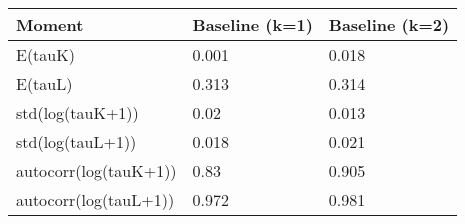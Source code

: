 \begin{tabular}{lll}
Moment & Baseline (k=1) & Baseline (k=2) \\ 
\hline 
E(tauK) & 0.001 & 0.018 \\ 
E(tauL) & 0.313 & 0.314 \\ 
std(log(tauK+1)) & 0.02 & 0.013 \\ 
std(log(tauL+1)) & 0.018 & 0.021 \\ 
autocorr(log(tauK+1)) & 0.83 & 0.905 \\ 
autocorr(log(tauL+1)) & 0.972 & 0.981 \\ 
\hline 
\end{tabular}